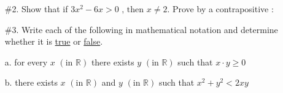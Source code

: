 \documentclass[10pt,letterpaper]{article}
\begin{document}
{\begin{enumerate}
\begin{flushleft}
Are $\bar{p} \rightarrow{q} \text{ and } p \wedge q \text{ logically equivalent?}$
\end{flushleft}

\vspace{4em}
\item[\#2.] Show that if $3x^{2} - 6x > 0 \text{ , then } x \neq 2. $ Prove by a contrapositive :
\vspace{4em}
\item[\#3.] Write each of the following in mathematical notation and determine whether it is \underline{true} or \underline{false}.
\vspace{1em}

a. for every $x$ $(\text{in }\mathbb{R})$ there exists $y$ $(\text{in }\mathbb{R})$ such that $x \cdot y \geq 0$
\vspace{4em}

b. there exists $x$ $(\text{in }\mathbb{R})$ and $y$ $(\text{in }\mathbb{R})$ such that $x^{2} + y^{2} < 2xy$
\vspace{4em}



\end{enumerate}
}
\end{document}
